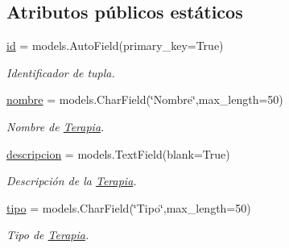 \subsection*{Atributos públicos estáticos}
\begin{DoxyCompactItemize}
\item 
\hyperlink{classappEmotionIOT_1_1models_1_1Terapia_ae08cf58b19507e8f974cb81278345a34}{id} = models.\+Auto\+Field(primary\+\_\+key=True)\hypertarget{classappEmotionIOT_1_1models_1_1Terapia_ae08cf58b19507e8f974cb81278345a34}{}\label{classappEmotionIOT_1_1models_1_1Terapia_ae08cf58b19507e8f974cb81278345a34}

\begin{DoxyCompactList}\small\item\em Identificador de tupla. \end{DoxyCompactList}\item 
\hyperlink{classappEmotionIOT_1_1models_1_1Terapia_a4891ecb74e12cecd37d50f59f2e5ea6f}{nombre} = models.\+Char\+Field(\char`\"{}Nombre\char`\"{},max\+\_\+length=50)\hypertarget{classappEmotionIOT_1_1models_1_1Terapia_a4891ecb74e12cecd37d50f59f2e5ea6f}{}\label{classappEmotionIOT_1_1models_1_1Terapia_a4891ecb74e12cecd37d50f59f2e5ea6f}

\begin{DoxyCompactList}\small\item\em Nombre de \hyperlink{classappEmotionIOT_1_1models_1_1Terapia}{Terapia}. \end{DoxyCompactList}\item 
\hyperlink{classappEmotionIOT_1_1models_1_1Terapia_aa3aebcde5f2fd78524339ed181bb653b}{descripcion} = models.\+Text\+Field(blank=True)\hypertarget{classappEmotionIOT_1_1models_1_1Terapia_aa3aebcde5f2fd78524339ed181bb653b}{}\label{classappEmotionIOT_1_1models_1_1Terapia_aa3aebcde5f2fd78524339ed181bb653b}

\begin{DoxyCompactList}\small\item\em Descripción de la \hyperlink{classappEmotionIOT_1_1models_1_1Terapia}{Terapia}. \end{DoxyCompactList}\item 
\hyperlink{classappEmotionIOT_1_1models_1_1Terapia_aba465cf2231bba2d49429f99916fac2c}{tipo} = models.\+Char\+Field(\char`\"{}Tipo\char`\"{},max\+\_\+length=50)\hypertarget{classappEmotionIOT_1_1models_1_1Terapia_aba465cf2231bba2d49429f99916fac2c}{}\label{classappEmotionIOT_1_1models_1_1Terapia_aba465cf2231bba2d49429f99916fac2c}

\begin{DoxyCompactList}\small\item\em Tipo de \hyperlink{classappEmotionIOT_1_1models_1_1Terapia}{Terapia}. \end{DoxyCompactList}\end{DoxyCompactItemize}


